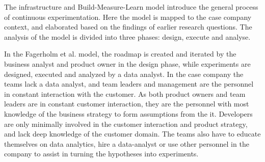\documentclass[english, grading]{tktltiki2}
\theoremstyle{definition}
\theoremstyle{remark}
\begin{document}
The infrastructure and Build-Measure-Learn model \cite{fagerholm2014building} introduce the general process of continuous experimentation. Here the model is mapped to the case company context, and elaborated based on the findings of earlier research questions. The analysis of the model is divided into three phases: design, execute and analyse. 





In the Fagerholm et al. model, the roadmap is created and iterated by the business analyst and product owner in the design phase, while experiments are designed, executed and analyzed by a data analyst. In the case company the teams lack a data analyst, and team leaders and management are the personnel in constant interaction with the customer. As both product owners and team leaders are in constant customer interaction, they are the personnel with most knowledge of the business strategy to form assumptions from the it. Developers are only minimally involved in the customer interaction and product strategy, and lack deep knowledge of the customer domain. The teams also have to educate themselves on data analytics, hire a data-analyst or use other personnel in the company to assist in turning the hypotheses into experiments. 
\end{document}
